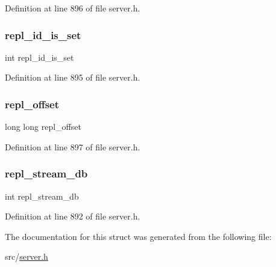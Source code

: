 Definition at line 896 of file server.\+h.

\mbox{\label{structrdb_save_info_aaceb90ef64847700ff5b9c91df9d7bf5}} 
\subsubsection{\texorpdfstring{repl\+\_\+id\+\_\+is\+\_\+set}{repl\_id\_is\_set}}
{\footnotesize\ttfamily int repl\+\_\+id\+\_\+is\+\_\+set}



Definition at line 895 of file server.\+h.

\mbox{\label{structrdb_save_info_acaaa973071b682ff89c70991a2d3ce7a}} 
\subsubsection{\texorpdfstring{repl\+\_\+offset}{repl\_offset}}
{\footnotesize\ttfamily long long repl\+\_\+offset}



Definition at line 897 of file server.\+h.

\mbox{\label{structrdb_save_info_a839a288ca668f38e63ba0fd17f6ae8c5}} 
\subsubsection{\texorpdfstring{repl\+\_\+stream\+\_\+db}{repl\_stream\_db}}
{\footnotesize\ttfamily int repl\+\_\+stream\+\_\+db}



Definition at line 892 of file server.\+h.



The documentation for this struct was generated from the following file\+:\begin{DoxyCompactItemize}
\item 
src/\hyperlink{server_8h}{server.\+h}\end{DoxyCompactItemize}
